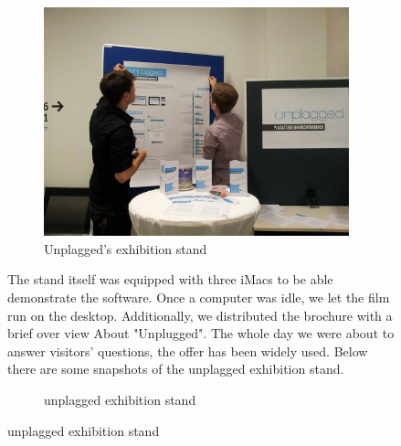 \begin{figure}[!hbtp]
\begin{figure}[!hbtp]
  \centering
    \includegraphics[width=0.97\textwidth]{images/unplagged_exhibition_stand1.jpg}
  \caption{Unplagged's exhibition stand}
  \label{fig:unplagged_exhibition_stand1}
\end{figure}


\pagebreak

The stand itself was equipped with three iMacs to be able demonstrate the software.
Once a computer was idle, we let the film run on the desktop.
Additionally, we distributed the brochure with a brief over view About "Unplugged".
The whole day we were about to answer visitors' questions, the offer has been widely used.
Below there are some snapshots of the unplagged exhibition stand.

\begin{figure}[!hbtp]
  \centering
  \caption{unplagged exhibition stand}
  \label{fig:unplagged_exhibition_stand2}
\end{figure}


\end{figure}
